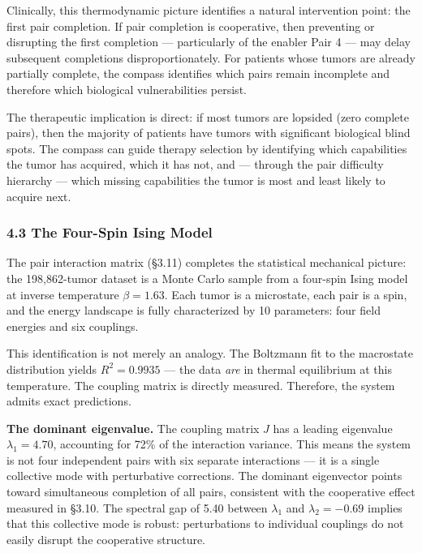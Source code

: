 \documentclass[
  11pt,
]{article}
\begin{document}
Clinically, this thermodynamic picture identifies a natural intervention
point: the first pair completion. If pair completion is cooperative,
then preventing or disrupting the first completion --- particularly of
the enabler Pair 4 --- may delay subsequent completions
disproportionately. For patients whose tumors are already partially
complete, the compass identifies which pairs remain incomplete and
therefore which biological vulnerabilities persist.

The therapeutic implication is direct: if most tumors are lopsided (zero
complete pairs), then the majority of patients have tumors with
significant biological blind spots. The compass can guide therapy
selection by identifying which capabilities the tumor has acquired,
which it has not, and --- through the pair difficulty hierarchy ---
which missing capabilities the tumor is most and least likely to acquire
next.

\subsubsection{4.3 The Four-Spin Ising
Model}\label{the-four-spin-ising-model}

The pair interaction matrix (§3.11) completes the statistical mechanical
picture: the 198,862-tumor dataset is a Monte Carlo sample from a
four-spin Ising model at inverse temperature \(\beta = 1.63\). Each
tumor is a microstate, each pair is a spin, and the energy landscape is
fully characterized by 10 parameters: four field energies and six
couplings.

This identification is not merely an analogy. The Boltzmann fit to the
macrostate distribution yields \(R^2 = 0.9935\) --- the data \emph{are}
in thermal equilibrium at this temperature. The coupling matrix is
directly measured. Therefore, the system admits exact predictions.

\textbf{The dominant eigenvalue.} The coupling matrix \(J\) has a
leading eigenvalue \(\lambda_1 = 4.70\), accounting for 72\% of the
interaction variance. This means the system is not four independent
pairs with six separate interactions --- it is a single collective mode
with perturbative corrections. The dominant eigenvector points toward
simultaneous completion of all pairs, consistent with the cooperative
effect measured in §3.10. The spectral gap of 5.40 between \(\lambda_1\)
and \(\lambda_2 = -0.69\) implies that this collective mode is robust:
perturbations to individual couplings do not easily disrupt the
cooperative structure.
\end{document}
